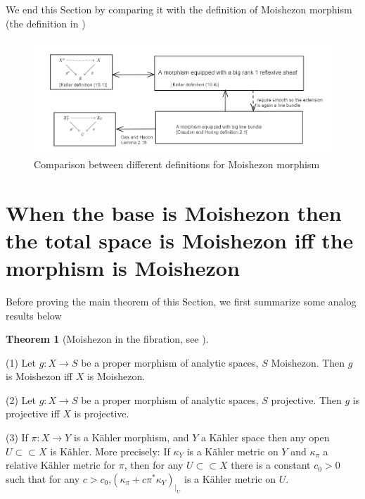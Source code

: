 \documentclass[11pt]{article}
\theoremstyle{definition}
\newtheorem{theorem}{Theorem}[section]
\begin{document}
	We end this Section by comparing it with the definition of Moishezon morphism (the definition in \cite{Moishezonmorphism})
	\begin{figure}[H]
		\centering
		\includegraphics[width=0.85\linewidth]{"Moishezon morphism definition"}
		\caption{Comparison between different definitions for Moishezon morphism}
		\label{fig:moishezon-morphism-definition}
	\end{figure}
	
	\section{When the base is Moishezon then the total space is Moishezon iff the morphism is Moishezon}
	Before proving the main theorem of this Section, we first summarize some analog results below
	
	\begin{theorem}[Moishezon in the fibration, see \cite{Moishezonmorphism,Jean}]~


	(1) Let $g: X \rightarrow S$ be a proper morphism of analytic spaces, $S$ Moishezon. Then $g$ is Moishezon iff $X$ is Moishezon.
	
	(2) Let $g:X\to S$ be a proper morphism of analytic spaces, $S$ projective. Then $g$ is projective iff $X$ is projective.
	
	(3) If $\pi: X \rightarrow Y$ is a Kähler morphism, and $Y$ a Kähler space then any open $U \subset \subset X$ is Kähler. More precisely: If $\kappa_Y$ is a Kähler metric on $Y$ and $\kappa_\pi$ a relative Kähler metric for $\pi$, then for any $U \subset \subset X$ there is a constant $c_0>0$ such that for any $c>c_0$,$\left(\kappa_\pi+c \pi^* \kappa_Y\right)_{\left.\right|_U}$ is a Kähler metric on $U$.

	\end{theorem}
	
\end{document}
